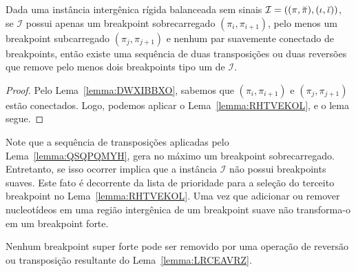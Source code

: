\begin{lemma}\label{lemma:QSQPQMYH}
Dada uma instância intergênica rígida balanceada sem sinais $\mathcal{I}=((\pi,\breve\pi),\break(\iota,\breve\iota))$, se $\mathcal{I}$ possui apenas um breakpoint sobrecarregado $(\pi_i,\pi_{i+1})$, pelo menos um breakpoint subcarregado $(\pi_j,\pi_{j+1})$ e nenhum par suavemente conectado de breakpoints, então existe uma sequência de duas transposições ou duas reversões que remove pelo menos dois breakpoints tipo um de $\mathcal{I}$.
\end{lemma}
\begin{proof}
Pelo Lema~\ref{lemma:DWXIBBXO}, sabemos que $(\pi_i,\pi_{i+1})$ e $(\pi_j,\pi_{j+1})$ estão conectados. Logo, podemos aplicar o Lema~\ref{lemma:RHTVEKOL}, e o lema segue.
\end{proof}

Note que a sequência de transposições aplicadas pelo Lema~\ref{lemma:QSQPQMYH}, gera no máximo um breakpoint sobrecarregado. Entretanto, se isso ocorrer implica que a instância $\mathcal{I}$ não possui breakpoints suaves. Este fato é decorrente da lista de prioridade para a seleção do terceito breakpoint no Lema~\ref{lemma:RHTVEKOL}. Uma vez que adicionar ou remover nucleotídeos em uma região intergênica de um breakpoint suave não transforma-o em um breakpoint forte.

\begin{remark}\label{remark:QVNWZDDQ}
Nenhum breakpoint super forte pode ser removido por uma operação de reversão ou transposição resultante do Lema~\ref{lemma:LRCEAVRZ}.
\end{remark}

